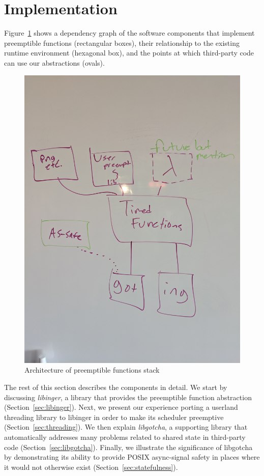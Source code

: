 \section{Implementation}

Figure~\ref{fig:architecture} shows a dependency graph of the software
components that implement preemptible functions (rectangular boxes), their
relationship to the existing
runtime environment (hexagonal box), and the points at which third-party code can use
our abstractions (ovals).

\begin{figure}
\includegraphics[height=\columnwidth]{figs/architecture}
\caption{Architecture of preemptible functions stack}
\label{fig:architecture}
\end{figure}

The rest of this section describes the components in detail.  We start by discussing
\textit{libinger}, a library that provides the preemptible function abstraction
(Section~\ref{sec:libinger}).  Next, we present our experience porting a userland
threading library to libinger in order to make its scheduler preemptive
(Section~\ref{sec:threading}).  We then explain \textit{libgotcha}, a supporting
library that automatically addresses many problems related to shared state in
third-party code (Section~\ref{sec:libgotcha}).  Finally, we illustrate the
significance of libgotcha by demonstrating its ability to provide POSIX async-signal
safety in places where it would not otherwise exist (Section~\ref{sec:statefulness}).



